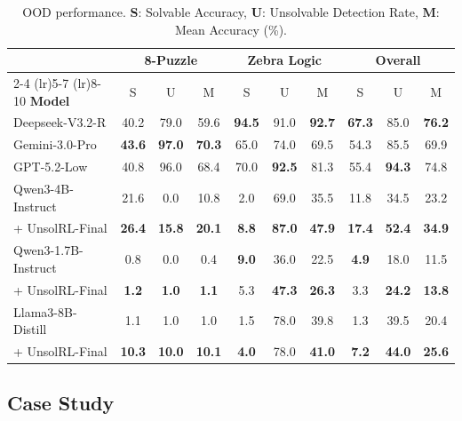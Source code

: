 \begin{table}[h]
\centering
\small 
\begin{tabular}{l *{3}{c} *{3}{c} *{3}{c}}
    \toprule
    & \multicolumn{3}{c}{\textbf{8-Puzzle}} & \multicolumn{3}{c}{\textbf{Zebra Logic}} & \multicolumn{3}{c}{\textbf{Overall}} \\
    \cmidrule(lr){2-4} \cmidrule(lr){5-7} \cmidrule(lr){8-10}
    \textbf{Model} & S & U & M & S & U & M & S & U & M \\
    \midrule
    Deepseek-V3.2-R  & 40.2 & 79.0 & 59.6 & \textbf{94.5} & 91.0 & \textbf{92.7} & \textbf{67.3} & 85.0 & \textbf{76.2}\\
    Gemini-3.0-Pro  & \textbf{43.6}& \textbf{97.0} & \textbf{70.3} & 65.0 & 74.0 & 69.5 & 54.3 & 85.5 & 69.9 \\
    GPT-5.2-Low  & 40.8 & 96.0 & 68.4 & 70.0 & \textbf{92.5} & 81.3 & 55.4 & \textbf{94.3} & 74.8 \\

    \midrule
    Qwen3-4B-Instruct & 21.6 & 0.0 & 10.8 & 2.0 & 69.0 & 35.5 & 11.8 & 34.5 & 23.2 \\
    + UnsolRL-Final   & \textbf{26.4} & \textbf{15.8} & \textbf{20.1} & \textbf{8.8} & \textbf{87.0} & \textbf{47.9} & \textbf{17.4} & \textbf{52.4} & \textbf{34.9} \\
    \midrule
    Qwen3-1.7B-Instruct & 0.8 & 0.0 & 0.4 & \textbf{9.0} & 36.0 & 22.5 & \textbf{4.9} & 18.0 & 11.5 \\
    + UnsolRL-Final     & \textbf{1.2} & \textbf{1.0} & \textbf{1.1} & 5.3 & \textbf{47.3} & \textbf{26.3} & 3.3 & \textbf{24.2} & \textbf{13.8} \\
    \midrule
    Llama3-8B-Distill & 1.1 & 1.0 & 1.0 & 1.5 & 78.0 & 39.8 & 1.3 & 39.5 & 20.4 \\
    + UnsolRL-Final  & \textbf{10.3} & \textbf{10.0} & \textbf{10.1} & \textbf{4.0} & 78.0 & \textbf{41.0} & \textbf{7.2} & \textbf{44.0} & \textbf{25.6} \\
    \bottomrule
\end{tabular}
\caption{OOD performance. \textbf{S}: Solvable Accuracy, \textbf{U}: Unsolvable Detection Rate, \textbf{M}: Mean Accuracy (\%).}
\label{tab:ood_single_column_trimmed}
\end{table}

\subsection{Case Study}

